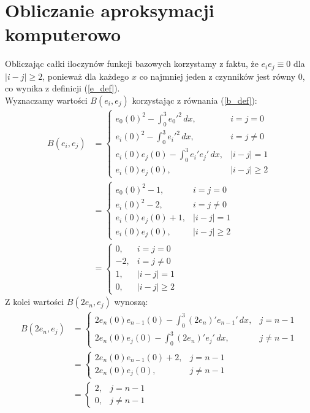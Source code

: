 \documentclass[a4paper,12pt]{article}
\begin{document}
    \section{Obliczanie aproksymacji komputerowo}
    Obliczając całki iloczynów funkcji bazowych korzystamy z faktu, że \(e_i e_j \equiv 0\) dla \(|i-j| \geq 2\), ponieważ dla każdego \(x\) co najmniej jeden z czynników jest równy 0, co wynika z definicji (\ref{e_def}).\\
    Wyznaczamy wartości \(B(e_i, e_j)\) korzystając z równania (\ref{b_def}):
    \begin{align}
        B(e_i, e_j) &=
        \begin{cases}
            e_0(0)^2 - \int_{0}^{3} e_0'^2\,dx,& i = j = 0 \\
            e_i(0)^2 - \int_{0}^{3} e_i'^2\,dx,& i = j \neq 0 \\
            e_i(0)e_j(0) - \int_{0}^{3} e_i' e_j'\,dx,& |i-j| = 1 \\
            e_i(0)e_j(0),& |i-j| \geq 2
        \end{cases} \nonumber \\
        &=
        \begin{cases}
            e_0(0)^2 - 1,& i = j = 0 \\
            e_i(0)^2 - 2,& i = j \neq 0 \\
            e_i(0)e_j(0) + 1,& |i-j| = 1 \\
            e_i(0)e_j(0),& |i-j| \geq 2
        \end{cases} \nonumber \\
        &=
        \begin{cases}
            0,& i = j = 0 \\
            -2,& i = j \neq 0 \\
            1,& |i-j| = 1 \\
            0,& |i-j| \geq 2
        \end{cases} \label{bij_val}
    \end{align}
    Z kolei wartości \(B(2e_n, e_j)\) wynoszą:
    \begin{align}
        B(2e_n, e_j) &=
        \begin{cases}
            2e_n(0)e_{n-1}(0) - \int_{0}^{3} (2e_n)' e_{n-1}'\,dx,& j = n-1 \\
            2e_n(0)e_j(0) - \int_{0}^{3} (2e_n)' e_j'\,dx,& j \neq n-1
        \end{cases} \nonumber \\
        &=
        \begin{cases}
            2e_n(0)e_{n-1}(0) + 2,& j = n-1 \\
            2e_n(0)e_j(0),& j \neq n-1
        \end{cases} \nonumber \\
        &=
        \begin{cases}
            2,& j = n-1 \\
            0,& j \neq n-1
        \end{cases} \label{bnj_val}
    \end{align}
\end{document}

